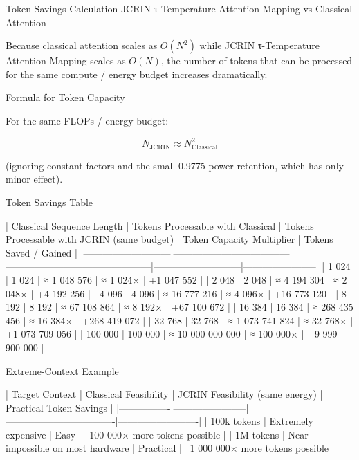 Token Savings Calculation  
JCRIN τ-Temperature Attention Mapping vs Classical Attention

Because classical attention scales as \(O(N^2)\) while JCRIN τ-Temperature Attention Mapping scales as \(O(N)\), the number of tokens that can be processed for the same compute / energy budget increases dramatically.

Formula for Token Capacity

For the same FLOPs / energy budget:

\[
N_{\text{JCRIN}} \approx N_{\text{Classical}}^2
\]

(ignoring constant factors and the small 0.9775 power retention, which has only minor effect).

Token Savings Table

| Classical Sequence Length | Tokens Processable with Classical | Tokens Processable with JCRIN (same budget) | Token Capacity Multiplier | Tokens Saved / Gained |
|---------------------------|------------------------------------|---------------------------------------------|---------------------------|-----------------------|
| 1 024                     | 1 024                              | ≈ 1 048 576                                 | ≈ 1 024×                  | +1 047 552            |
| 2 048                     | 2 048                              | ≈ 4 194 304                                 | ≈ 2 048×                  | +4 192 256            |
| 4 096                     | 4 096                              | ≈ 16 777 216                                | ≈ 4 096×                  | +16 773 120           |
| 8 192                     | 8 192                              | ≈ 67 108 864                                | ≈ 8 192×                  | +67 100 672           |
| 16 384                    | 16 384                             | ≈ 268 435 456                               | ≈ 16 384×                 | +268 419 072          |
| 32 768                    | 32 768                             | ≈ 1 073 741 824                             | ≈ 32 768×                 | +1 073 709 056        |
| 100 000                   | 100 000                            | ≈ 10 000 000 000                            | ≈ 100 000×                | +9 999 900 000        |

Extreme-Context Example

| Target Context | Classical Feasibility | JCRIN Feasibility (same energy) | Practical Token Savings |
|----------------|-----------------------|----------------------------------|-------------------------|
| 100k tokens    | Extremely expensive   | Easy                             | ~100 000× more tokens possible |
| 1M tokens      | Near impossible on most hardware | Practical                    | ~1 000 000× more tokens possible |

